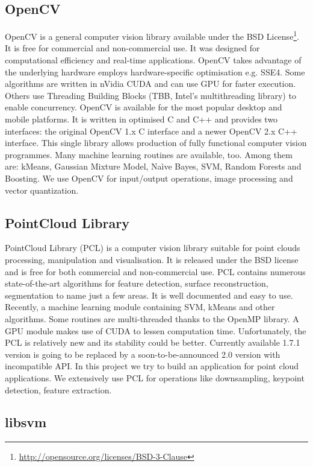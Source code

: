 	\subsection{OpenCV}
	OpenCV is a general computer vision library available under the BSD License\footnote{\url{http://opensource.org/licenses/BSD-3-Clause}}. It is free for commercial and non-commercial use. It was designed for computational efficiency and real-time applications. OpenCV takes advantage of the underlying hardware employs hardware-specific optimisation e.g. SSE4. Some algorithms are written in nVidia CUDA and can use GPU for faster execution. Others use Threading Building Blocks (TBB, Intel's multithreading library) to enable concurrency. OpenCV is available for the most popular desktop and mobile platforms. It is written in optimised C and C++ and provides two interfaces: the original OpenCV 1.x C interface and a newer OpenCV 2.x C++ interface. This single library allows production of fully functional computer vision programmes. Many machine learning routines are available, too. Among them are: kMeans, Gaussian Mixture Model, Na\`ive Bayes, SVM, Random Forests and Boosting. We use OpenCV for input/output operations, image processing and vector quantization.
	
	\subsection{PointCloud Library}
	PointCloud Library (PCL) is a computer vision library suitable for point clouds processing, manipulation and visualisation. It is released under the BSD license and is free for both commercial and non-commercial use. PCL contains numerous state-of-the-art algorithms for feature detection, surface reconstruction, segmentation to name just a few areas. It is well documented and easy to use. Recently, a machine learning module containing SVM, kMeans and other algorithms. Some routines are multi-threaded thanks to the OpenMP library. A GPU module makes use of CUDA to lessen computation time. Unfortunately, the PCL is relatively new and its stability could be better. Currently available 1.7.1 version is going to be replaced by a soon-to-be-announced 2.0 version with incompatible API. In this project we try to build an application for point cloud applications. We extensively use PCL for operations like downsampling, keypoint detection, feature extraction.
	
	\subsection{libsvm}
